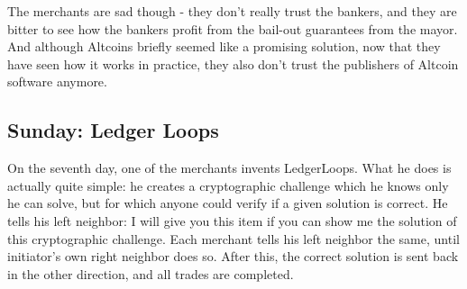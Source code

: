 \documentclass[11pt,twoside,a4paper]{article}
\begin{document}
The merchants are sad though - they don't really trust the bankers, and they are bitter to see how the bankers profit from the bail-out guarantees from the mayor. And although Altcoins briefly seemed like a promising solution, now that they have seen how it works in practice, they also don't trust the publishers of Altcoin software anymore.

\subsection{Sunday: Ledger Loops}
On the seventh day, one of the merchants invents LedgerLoops. What he does is actually quite simple: he creates a cryptographic challenge which he knows only he can solve, but for which anyone could verify if a given solution is correct. He tells his left neighbor: I will give you this item if you can show me the solution of this cryptographic challenge. Each merchant tells his left neighbor the same, until initiator's own right neighbor does so. After this, the correct solution is sent back in the other direction, and all trades are completed.
\end{document}
